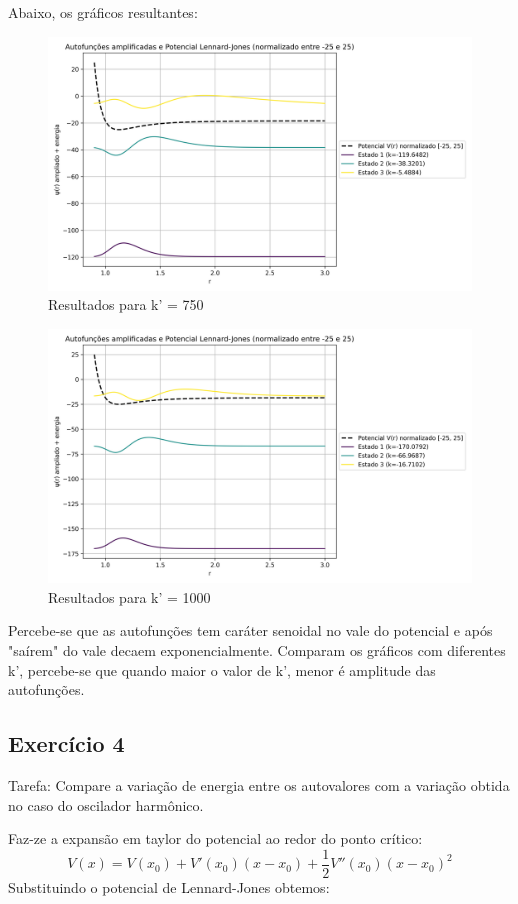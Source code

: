 \documentclass[12pt, a4paper]{article} %
\begin{document}
            Abaixo, os gr\'aficos resultantes:

            \begin{figure}[H]
                \centering
                \includegraphics[scale=0.7]{../images/ex3-results-750.png}
                \caption{Resultados para k' = 750}
            \end{figure}
            \begin{figure}[H]
                \centering
                \includegraphics[scale=0.7]{../images/ex3-results-1000.png}
                \caption{Resultados para k' = 1000}
            \end{figure}

            Percebe-se que as autofun\c{c}\~oes tem car\'ater senoidal no vale do potencial e ap\'os "sa\'irem" do vale decaem exponencialmente.
            Comparam os gr\'aficos com diferentes k', percebe-se que quando maior o valor de k', menor \'e amplitude das autofun\c{c}\~oes.

        \subsection{Exerc\'icio 4}

            Tarefa: Compare a varia\c{c}\~ao de energia entre os autovalores com a varia\c{c}\~ao obtida no caso do oscilador harm\^onico.

            Faz-ze a expansão em taylor do potencial ao redor do ponto crítico:
            \begin{equation}
                V(x) = V(x_0) + V'(x_0)(x - x_0) + \frac{1}{2} V''(x_0)(x - x_0)^2
            \end{equation}
            Substituindo o potencial de Lennard-Jones obtemos:
            
\end{document}
